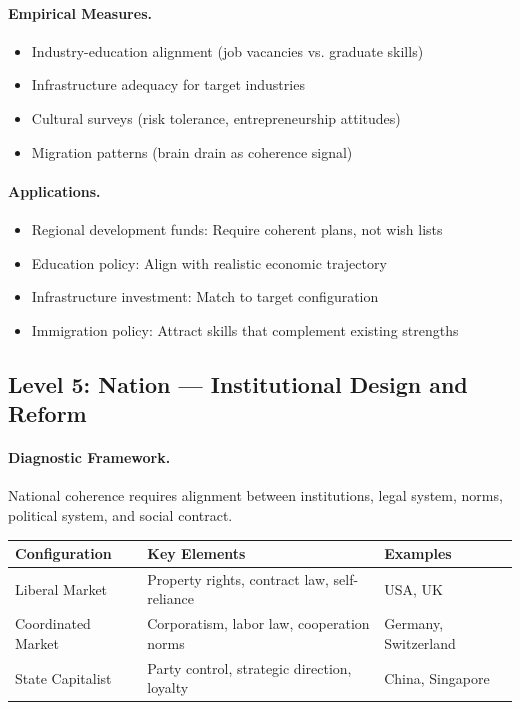 \documentclass[12pt,a4paper]{article}
\begin{document}
\paragraph{Empirical Measures.}
\begin{itemize}
  \item Industry-education alignment (job vacancies vs. graduate skills)
  \item Infrastructure adequacy for target industries
  \item Cultural surveys (risk tolerance, entrepreneurship attitudes)
  \item Migration patterns (brain drain as coherence signal)
\end{itemize}

\paragraph{Applications.}
\begin{itemize}
  \item Regional development funds: Require coherent plans, not wish lists
  \item Education policy: Align with realistic economic trajectory
  \item Infrastructure investment: Match to target configuration
  \item Immigration policy: Attract skills that complement existing strengths
\end{itemize}

\subsection{Level 5: Nation --- Institutional Design and Reform}

\paragraph{Diagnostic Framework.}
National coherence requires alignment between institutions, legal system,
norms, political system, and social contract.

\begin{center}
\renewcommand{\arraystretch}{1.2}
\begin{tabular}{lll}
\hline
\textbf{Configuration} & \textbf{Key Elements} & \textbf{Examples} \\
\hline
Liberal Market & Property rights, contract law, self-reliance & USA, UK \\
Coordinated Market & Corporatism, labor law, cooperation norms & Germany, Switzerland \\
State Capitalist & Party control, strategic direction, loyalty & China, Singapore \\
\hline
\end{tabular}
\end{center}
\end{document}
